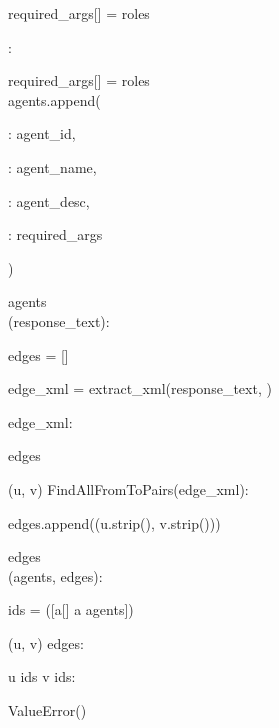 \begin{subagent}[title=高 DoM 解析器]
\quad\quad\quad\quad required\_args[] = roles

\quad\quad\quad {}:

\quad\quad\quad\quad required\_args[] = roles \\

\quad\quad agents.append(\code{\{}

\quad\quad\quad {}: agent\_id,

\quad\quad\quad {}: agent\_name,

\quad\quad\quad {}: agent\_desc,

\quad\quad\quad {}: required\_args

\quad\quad \code{\}})

\quad {} agents \\



 (response\_text):

\quad edges = []

\quad edge\_xml = extract\_xml(response\_text, )

\quad {}  edge\_xml:

\quad\quad {} edges \\

\quad {}

\quad {} (u, v)  FindAllFromToPairs(edge\_xml):

\quad\quad edges.append((u.strip(), v.strip()))

\quad {} edges \\



 (agents, edges):

\quad {}

\quad ids = ([a[]  a  agents])

\quad {} (u, v)  edges:

\quad\quad {} u  ids  v  ids:

\quad\quad\quad {} ValueError() \\


\quad {}


\end{subagent}
